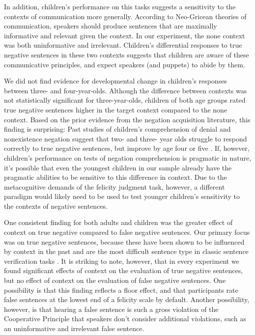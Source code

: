 \documentclass[man, noapacite]{apa2}
\begin{document}
In addition, children's performance on this tasks suggests a sensitivity to the contexts of communication more generally. According to Neo-Gricean theories of communication, speakers should produce sentences that are maximally informative and relevant given the context. In our experiment, the none context was both uninformative and irrelevant. Children's differential responses to true negative sentences in these two contexts suggests that children are aware of these communicative principles, and expect speakers (and puppets) to abide by them.

We did not find evidence for developmental change in children's responses between three- and four-year-olds. Although the difference between contexts was not statistically significant for three-year-olds, children of both age groups rated true negative sentences higher in the target context compared to the none context. Based on the prior evidence from the negation acquisition literature, this finding is surprising: Past studies of children's comprehension of denial and nonexistence negation suggest that two- and three- year olds struggle to respond correctly to true negative sentences, but improve by age four or five \cite{kim1985, nordmeyer2014b}. If, however, children's performance on tests of negation comprehension is pragmatic in nature, it's possible that even the youngest children in our sample already have the pragmatic abilities to be sensitive to this difference in context. Due to the metacognitive demands of the felicity judgment task, however, a different paradigm would likely need to be used to test younger children's sensitivity to the contexts of negative sentences.

One consistent finding for both adults and children was the greater effect of context on true negative compared to false negative sentences. Our primary focus was on true negative sentences, because these have been shown to be influenced by context in the past \cite{wason1965, glenberg1999, nordmeyer2014b} and are the most difficult sentence type in classic sentence verification tasks \cite{hclark1972}. It is striking to note, however, that in every experiment we found significant effects of context on the evaluation of true negative sentences, but no effect of context on the evaluation of false negative sentences. One possibility is that this finding reflects a floor effect, and that participants rate false sentences at the lowest end of a felicity scale by default. Another possibility, however, is that hearing a false sentence is such a gross violation of the Cooperative Principle that speakers don't consider additional violations, such as an uninformative and irrelevant false sentence.
\end{document}
